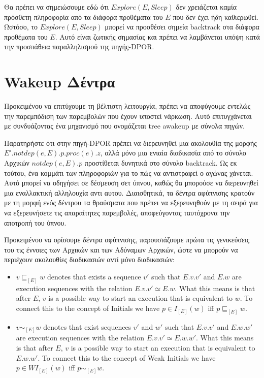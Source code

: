 Θα πρέπει να σημειώσουμε εδώ ότι $Explore(E, Sleep)$ δεν χρειάζεται καμία πρόσθετη πληροφορία από τα διάφορα προθέματα του $E$ που
δεν έχει ήδη καθιερωθεί. Ωστόσο, το $Explore(E, Sleep)$ μπορεί να προσθέσει σημεία backtrack στα διάφορα προθέματα του $E$. Αυτό
είναι ζωτικής σημασίας και πρέπει να λαμβάνεται υπόψη κατά την προσπάθεια παραλληλισμού της πηγής-DPOR.

\section{Wakeup Δέντρα}

Προκειμένου να επιτύχουμε τη βέλτιστη λειτουργία, πρέπει να αποφύγουμε εντελώς την παρεμπόδιση των παρεμβολών που έχουν υποστεί νάρκωση. Αυτό επιτυγχάνεται με
συνδυάζοντας ένα μηχανισμό που ονομάζεται tree awakeup \cite{AbdullaAronisJohnssonSagonasDPOR2014} με σύνολα πηγών.

Παρατηρήστε ότι στην πηγή-DPOR πρέπει να διερευνηθεί μια ακολουθία της μορφής $E'.notdep(e,E).p.proc(e).z$, αλλά μόνο
μια ενιαία διαδικασία από το σύνολο Αρχικών $notdep(e,E).p$ προστίθεται δυνητικά στο σύνολο backtrack.
Ως εκ τούτου, ένα κομμάτι
των πληροφοριών για το πώς να αντιστραφεί ο αγώνας χάνεται. Αυτό μπορεί να οδηγήσει σε δέσμευση σετ ύπνου, καθώς θα μπορούσε να διερευνηθεί μια εναλλακτική αλληλουχία
αντι αυτου. Διαισθητικά, τα δέντρα αφύπνισης κρατούν με τη μορφή ενός δέντρου τα θραύσματα που πρέπει να εξερευνηθούν με τη σειρά
για να εξερευνήσετε τις απαραίτητες παρεμβολές, αποφεύγοντας ταυτόχρονα την αποτροπή του ύπνου.

Προκειμένου να ορίσουμε δέντρα αφύπνισης, παρουσιάζουμε πρώτα τις γενικεύσεις του
τις έννοιες των Αρχικών και των Αδύναμων Αρχικών, ώστε να μπορούν να περιέχουν ακολουθίες διαδικασιών αντί μόνο διαδικασιών:

\begin{itemize}
    \item $v \sqsubseteq_{[E]} w $ denotes that exists a sequence $v'$ such that $E.v.v'$ and $E.w$ are execution
    sequences with the relation $E.v.v' \simeq E.w$. What this means is that after $E$, $v$ is a possible
    way to start an execution that is equivalent to $w$. To connect this to the concept of Initials we have
    $p \in I_{[E]}(w)$ iff $p \sqsubseteq_{[E]} w $.
    \item $v \sim_{[E]} w $ denotes that exist sequences $v'$ and $w'$ such
    that $E.v.v'$ and $E.w.w'$ are execution sequences with the relation $E.v.v' \simeq E.w.w'$.
    What this means is that after $E$, $v$ is a possible way to start an execution that is equivalent to $E.w.w'$.
    To connect this to the concept of Weak Initials we have $p \in WI_{[E]}(w)$ iff $p \sim_{[E]} w $.
\end{itemize}


